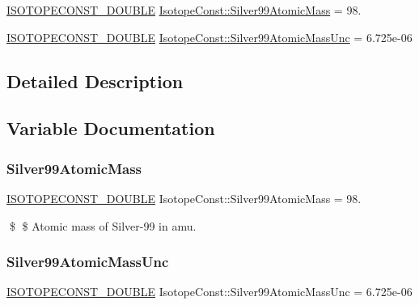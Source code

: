 \begin{DoxyCompactItemize}
\item 
\mbox{\hyperlink{group___isotope_const-_macros_ga8f45a7272ce02c0b4c65c44636ed719a}{I\+S\+O\+T\+O\+P\+E\+C\+O\+N\+S\+T\+\_\+\+D\+O\+U\+B\+LE}} \mbox{\hyperlink{group___isotope_const-_silver-_ag99_gab1ee34d286680cbc9c73b2ad076347c5}{Isotope\+Const\+::\+Silver99\+Atomic\+Mass}} = 98.
\item 
\mbox{\hyperlink{group___isotope_const-_macros_ga8f45a7272ce02c0b4c65c44636ed719a}{I\+S\+O\+T\+O\+P\+E\+C\+O\+N\+S\+T\+\_\+\+D\+O\+U\+B\+LE}} \mbox{\hyperlink{group___isotope_const-_silver-_ag99_gaa6e1efa933c1facd974e2d10ad3be609}{Isotope\+Const\+::\+Silver99\+Atomic\+Mass\+Unc}} = 6.\+725e-\/06
\end{DoxyCompactItemize}


\subsection{Detailed Description}


\subsection{Variable Documentation}
\mbox{\label{group___isotope_const-_silver-_ag99_gab1ee34d286680cbc9c73b2ad076347c5}} 
\subsubsection{\texorpdfstring{Silver99\+Atomic\+Mass}{Silver99AtomicMass}}
{\footnotesize\ttfamily \mbox{\hyperlink{group___isotope_const-_macros_ga8f45a7272ce02c0b4c65c44636ed719a}{I\+S\+O\+T\+O\+P\+E\+C\+O\+N\+S\+T\+\_\+\+D\+O\+U\+B\+LE}} Isotope\+Const\+::\+Silver99\+Atomic\+Mass = 98.}

\$ \$ Atomic mass of Silver-\/99 in amu. \mbox{\label{group___isotope_const-_silver-_ag99_gaa6e1efa933c1facd974e2d10ad3be609}} 
\subsubsection{\texorpdfstring{Silver99\+Atomic\+Mass\+Unc}{Silver99AtomicMassUnc}}
{\footnotesize\ttfamily \mbox{\hyperlink{group___isotope_const-_macros_ga8f45a7272ce02c0b4c65c44636ed719a}{I\+S\+O\+T\+O\+P\+E\+C\+O\+N\+S\+T\+\_\+\+D\+O\+U\+B\+LE}} Isotope\+Const\+::\+Silver99\+Atomic\+Mass\+Unc = 6.\+725e-\/06}

